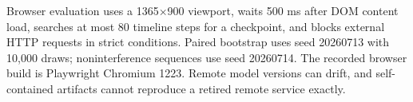 \documentclass[letterpaper]{article}
\begin{document}
Browser evaluation uses a 1365$\times$900 viewport, waits 500 ms after DOM content load, searches at most 80 timeline steps for a checkpoint, and blocks external HTTP requests in strict conditions. Paired bootstrap uses seed 20260713 with 10,000 draws; noninterference sequences use seed 20260714. The recorded browser build is Playwright Chromium 1223. Remote model versions can drift, and self-contained artifacts cannot reproduce a retired remote service exactly.


\end{document}
